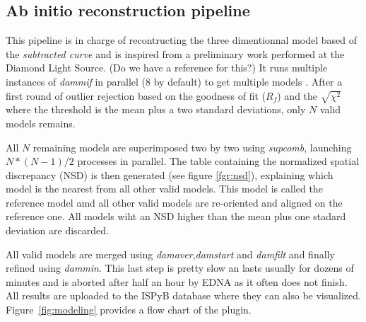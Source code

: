 \documentclass[preprint,pdf]{iucr}              %
\begin{document}
\subsection{Ab initio reconstruction pipeline}

This pipeline is in charge of recontructing the three dimentionnal model based
of the \textit{subtracted curve} and is inspired from a preliminary work
performed at the Diamond Light Source. (Do we have a reference for this?)
It runs multiple instances of \textit{dammif} in parallel (8 by default) to get
multiple models \cite{dammif}. 
After a first round of outlier rejection based on the goodness of fit ($R_{f}$) and the
$\sqrt{\chi^{2}}$  where the threshold is the mean plus a two standard
deviations, only $N$ valid models remains. 



All $N$ remaining models are superimposed two by two using
\textit{supcomb}\cite{supcomb}, launching $N*(N-1)/2$ processes in parallel.
The table containing the normalized spatial discrepancy (NSD) is then generated
(see figure \ref{fgr:nsd}), explaining which model is the nearest from all other
valid models. This model is called the reference model amd all other valid
models are re-oriented and aligned on the reference one. All models wiht an NSD higher than the mean plus one stadard deviation are discarded.


All valid models are merged using \textit{damaver}\cite{damaver},\textit{damstart} and
\textit{damfilt} and finally refined using \textit{dammin}\cite{dammin}.
This last step is pretty slow an lasts usually for dozens of minutes and is
aborted after half an hour by EDNA as it often does not finish. All results are
uploaded to the ISPyB database where they can also be visualized. Figure~\ref{fig:modeling} provides a flow chart of the plugin.
\end{document}
